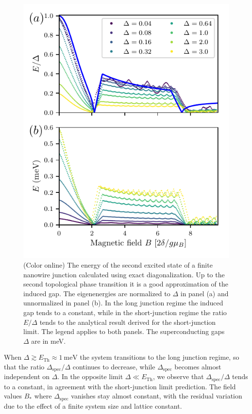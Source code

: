 \begin{figure}[h]
\includegraphics[width=0.9\columnwidth]{chapter_shortjunction/figures/scaling_ref}
\caption{(Color online) The energy of the second excited state of a finite nanowire junction calculated using exact diagonalization.
Up to the second topological phase transition it is a good approximation of the induced gap.
The eigenenergies are normalized to $\Delta$ in panel (a) and unnormalized in panel (b).
In the long junction regime the induced gap tends to a constant, while in the short-junction regime the ratio $E/\Delta$ tends to the analytical result derived for the short-junction limit.
The legend applies to both panels.
The superconducting gaps $\Delta$ are in meV.}
\label{fig:scaling_delta}
\end{figure}

When $\Delta \gtrsim E_\mathrm{Th}\approx \SI{1}{\meV}$ the system transitions to the long junction regime, so that the ratio $\Delta_\textrm{spec}/\Delta$ continues to decrease, while $\Delta_\text{spec}$ becomes almost independent on $\Delta$.
In the opposite limit $\Delta \ll E_\mathrm{Th}$, we observe that $\Delta_\textrm{spec}/\Delta$ tends to a constant, in agreement with the short-junction limit prediction.
The field values $B_*$ where $\Delta_\textrm{spec}$ vanishes stay almost constant, with the residual variation due to the effect of a finite system size and lattice constant.


